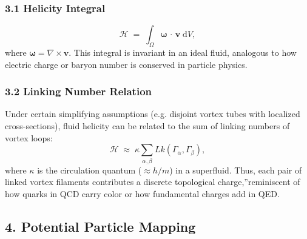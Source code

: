 \subsubsection*{3.1 Helicity Integral}

\[
    \mathcal{H}
    \;=\;
    \int_{\Omega}
    \boldsymbol{\omega}\,\cdot\,\mathbf{v}\;\mathrm{d}V,
\]
where \(\boldsymbol{\omega} = \nabla \times \mathbf{v}\). This integral is invariant in an ideal fluid, analogous to how electric charge or baryon number is conserved in particle physics.

\subsubsection*{3.2 Linking Number Relation}

Under certain simplifying assumptions (e.g. disjoint vortex tubes with localized cross-sections), fluid helicity can be related to the sum of linking numbers of vortex loops:
\[
    \mathcal{H}
    \;\approx\;
    \kappa
    \sum_{\alpha,\beta} Lk(\Gamma_\alpha, \Gamma_\beta),
\]
where \(\kappa\) is the circulation quantum (\(\approx h/m\)) in a superfluid. Thus, each pair of linked vortex filaments contributes a discrete topological \grqq charge,\textquotedblright reminiscent of how quarks in QCD carry color or how fundamental charges add in QED.

\subsection*{4. Potential Particle Mapping}

